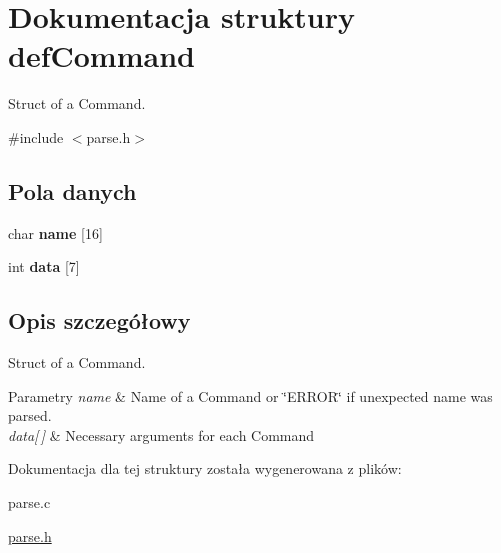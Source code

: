 \hypertarget{structdefCommand}{\section{Dokumentacja struktury def\-Command}
\label{structdefCommand}
}


Struct of a Command.




{\ttfamily \#include $<$parse.\-h$>$}

\subsection*{Pola danych}
\begin{DoxyCompactItemize}
\item 
\hypertarget{structdefCommand_a27292553fcf80ff41ed869da4e7eccd7}{char {\bfseries name} \mbox{[}16\mbox{]}}\label{structdefCommand_a27292553fcf80ff41ed869da4e7eccd7}

\item 
\hypertarget{structdefCommand_af3f537f753fe7b5b11a8d7fc987bf895}{int {\bfseries data} \mbox{[}7\mbox{]}}\label{structdefCommand_af3f537f753fe7b5b11a8d7fc987bf895}

\end{DoxyCompactItemize}


\subsection{Opis szczegółowy}
Struct of a Command.


\begin{DoxyParams}{Parametry}
{\em name} & Name of a Command or \char`\"{}\-E\-R\-R\-O\-R\char`\"{} if unexpected name was parsed. \\
\hline
{\em data\mbox{[}$\,$\mbox{]}} & Necessary arguments for each Command \\
\hline
\end{DoxyParams}


Dokumentacja dla tej struktury została wygenerowana z plików\-:\begin{DoxyCompactItemize}
\item 
parse.\-c\item 
\hyperlink{parse_8h}{parse.\-h}\end{DoxyCompactItemize}
